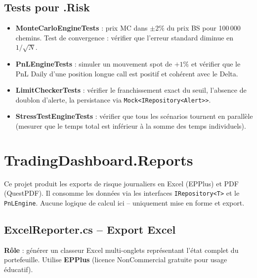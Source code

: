 \documentclass[a4paper,11pt]{article}
\newcommand{\cs}[1]{\texttt{\color{codeinline}#1}}
\begin{document}
\subsection{Tests pour .Risk}

\begin{itemize}
  \item \textbf{MonteCarloEngineTests} : prix MC dans $\pm 2\%$ du prix BS pour
        100\,000 chemins. Test de convergence : vérifier que l'erreur standard
        diminue en $1/\sqrt{N}$.
  \item \textbf{PnLEngineTests} : simuler un mouvement spot de $+1\%$ et vérifier
        que le PnL Daily d'une position longue call est positif et cohérent avec
        le Delta.
  \item \textbf{LimitCheckerTests} : vérifier le franchissement exact du seuil,
        l'absence de doublon d'alerte, la persistance via \cs{Mock<IRepository<Alert>>}.
  \item \textbf{StressTestEngineTests} : vérifier que tous les scénarios tournent
        en parallèle (mesurer que le temps total est inférieur à la somme des
        temps individuels).
\end{itemize}

\newpage

\section{TradingDashboard.Reports}

\begin{tcolorbox}[note]
Ce projet produit les exports de risque journaliers en Excel (EPPlus) et PDF
(QuestPDF). Il consomme les données via les interfaces \cs{IRepository<T>}
et le \cs{PnLEngine}. Aucune logique de calcul ici -- uniquement mise en forme
et export.
\end{tcolorbox}

\subsection{ExcelReporter.cs -- Export Excel}

\textbf{Rôle} : générer un classeur Excel multi-onglets représentant
l'état complet du portefeuille. Utilise \textbf{EPPlus} (licence
NonCommercial gratuite pour usage éducatif).
\end{document}
